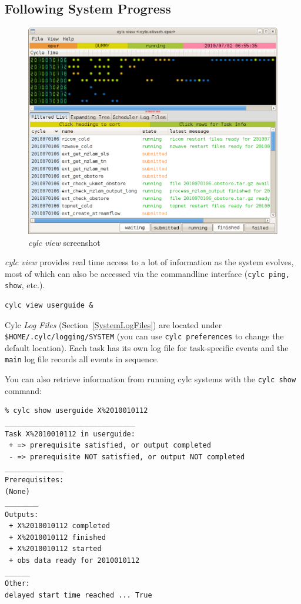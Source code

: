 \documentclass[11pt,a4paper]{article}
\begin{document}
\subsection{Following System Progress}
\label{QuickFollowingSystemProgress}

\begin{figure}
    \begin{center}
        \includegraphics[width=12cm]{cylc-view-ecoconnect} 
    \end{center}
    \caption{\small {\em cylc view} screenshot}
    \label{fig-monitor} 
\end{figure} 

{\em cylc view} provides real time access to a lot of information as 
the system evolves, most of which can also be accessed via the
commandline interface (\lstinline=cylc ping, show=, etc.).

\begin{lstlisting}
cylc view userguide &
\end{lstlisting}

Cylc {\em Log Files} (Section~\ref{SystemLogFiles}) are located 
under \lstinline=$HOME/.cylc/logging/SYSTEM= (you can use
\lstinline=cylc preferences= to change the default location). Each task
has its own log file for task-specific events and the \lstinline=main=
log file records all events in sequence.

You can also retrieve information from running cylc systems with the 
\lstinline=cylc show= command:

\lstset{language=}
\begin{lstlisting}
% cylc show userguide X%2010010112
_______________________________
Task X%2010010112 in userguide:
 + => prerequisite satisfied, or output completed
 - => prerequisite NOT satisfied, or output NOT completed
______________
Prerequisites:
(None)
________
Outputs:
 + X%2010010112 completed
 + X%2010010112 finished
 + X%2010010112 started
 + obs data ready for 2010010112
______
Other:
delayed start time reached ... True
\end{lstlisting}
\end{document}
